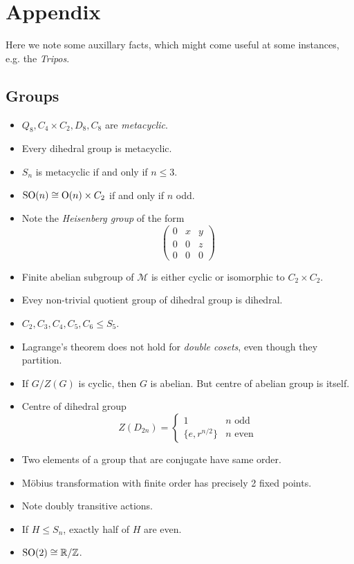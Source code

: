 \documentclass[10pt, a4paper, twoside]{report}
\begin{document}
    \chapter{Appendix}
    Here we note some auxillary facts, which might come useful at some instances, e.g. the \emph{Tripos}.
    \section{Groups}
    \begin{itemize}
        \item \(Q_8,C_4\times C_2, D_8, C_8\) are \emph{metacyclic}.
        \item Every dihedral group is metacyclic.
        \item \(S_n\) is metacyclic if and only if \(n\leq 3\).
        \item \(\operatorname{SO}(n)\cong\mathrm{O}(n)\times C_2\) if and only if \(n\) odd.
        \item Note the \emph{Heisenberg group} of the form 
        \[\begin{pmatrix}
            0 & x & y \\ 
            0 & 0 & z \\
            0 & 0 & 0
        \end{pmatrix}\]
        \item Finite abelian subgroup of \(\mathcal{M}\) is either cyclic or isomorphic to \(C_2\times C_2\).
        \item Evey non-trivial quotient group of dihedral group is dihedral.
        \item \(C_2,C_3,C_4,C_5,C_6\leq S_5\).
        \item Lagrange's theorem does not hold for \emph{double cosets}, even though they partition.
        \item If \(G/Z(G)\) is cyclic, then \(G\) is abelian. But centre of abelian group is itself.
        \item Centre of dihedral group 
        \[Z(D_{2n})=\begin{cases}
            1 & \text{\(n\) odd} \\
            \{e,r^{n/2}\} & \text{\(n\) even}
        \end{cases}\]
        \item Two elements of a group that are conjugate have same order.
        \item Möbius transformation with finite order has precisely 2 fixed points.
        \item Note doubly transitive actions.
        \item If \(H\leq S_n\), exactly half of \(H\) are even.
        \item \(\operatorname{SO}(2)\cong\mathbb{R}/\mathbb{Z}\).
    \end{itemize}
\end{document}
